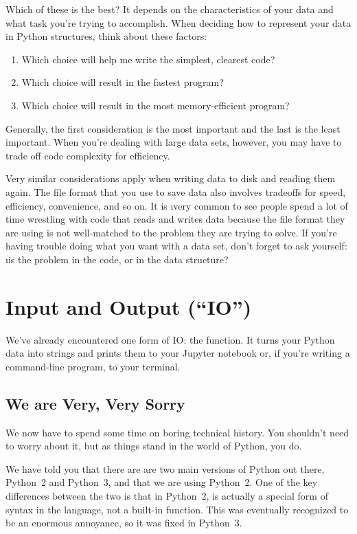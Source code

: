 \documentclass[letterpaper, 12pt, titlepage, twoside]{article}
\begin{document}
Which of these is the best? It depends on the characteristics of your data and
what task you're trying to accomplish. When deciding how to represent your data in
Python structures, think about these factors:

\begin{enumerate}
\item Which choice will help me write the simplest, clearest code?
\item Which choice will result in the fastest program?
\item Which choice will result in the most memory-efficient program?
\end{enumerate}

Generally, the first consideration is the most important and the last is the
least important. When you're dealing with large data sets, however, you may
have to trade off code complexity for efficiency.

Very similar considerations apply when writing data to disk and reading them
again. The file format that you use to save data also involves tradeoffs for
speed, efficiency, convenience, and so on. It is \i{very common} to see people
spend a lot of time wrestling with code that reads and writes data because the
file format they are using is not well-matched to the problem they are trying
to solve. If you're having trouble doing what you want with a data set, don't
forget to ask yourself: \i{is the problem in the code, or in the data
  structure}?


\newpage
\section{Input and Output (``IO'')}

We've already encountered one form of IO: the  function. It turns
your Python data into strings and prints them to your Jupyter notebook or, if
you're writing a command-line program, to your terminal.

\subsection*{We are Very, Very Sorry}

We now have to spend some time on boring technical history. You shouldn't need
to worry about it, but as things stand in the world of Python, you do.

We have told you that there are are two main versions of Python out there,
Python~2 and Python~3, and that we are using Python~2. One of the key
differences between the two is that in Python~2,  is actually a
special form of syntax in the language, not a built-in function. This was
eventually recognized to be an enormous annoyance, so it was fixed in
Python~3.
\end{document}
